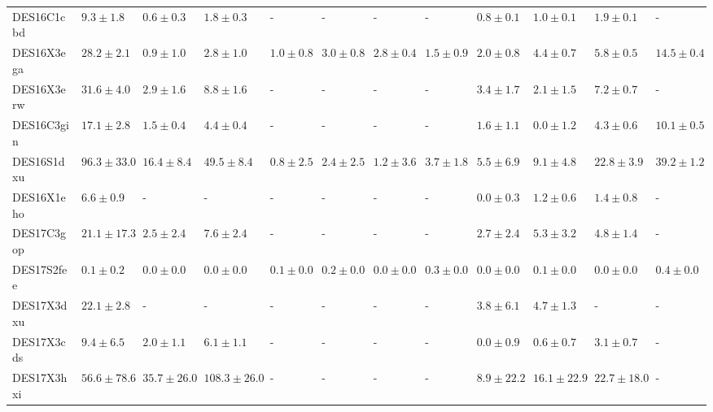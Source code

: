 \documentclass[fleqn,usenatbib,]{mnras}
\begin{document}
\begin{table}
\begin{tabular}{llllllllllll}
DES16C1cbd &    $9.3 \pm 1.8$ &    $0.6 \pm 0.3$ &     $1.8 \pm 0.3$ &               - &               - &               - &               - &   $0.8 \pm 0.1$ &    $1.0 \pm 0.1$ &    $1.9 \pm 0.1$ &                - \\
DES16X3ega &   $28.2 \pm 2.1$ &    $0.9 \pm 1.0$ &     $2.8 \pm 1.0$ &   $1.0 \pm 0.8$ &   $3.0 \pm 0.8$ &   $2.8 \pm 0.4$ &   $1.5 \pm 0.9$ &   $2.0 \pm 0.8$ &    $4.4 \pm 0.7$ &    $5.8 \pm 0.5$ &   $14.5 \pm 0.4$ \\
DES16X3erw &   $31.6 \pm 4.0$ &    $2.9 \pm 1.6$ &     $8.8 \pm 1.6$ &               - &               - &               - &               - &   $3.4 \pm 1.7$ &    $2.1 \pm 1.5$ &    $7.2 \pm 0.7$ &                - \\
DES16C3gin &   $17.1 \pm 2.8$ &    $1.5 \pm 0.4$ &     $4.4 \pm 0.4$ &               - &               - &               - &               - &   $1.6 \pm 1.1$ &    $0.0 \pm 1.2$ &    $4.3 \pm 0.6$ &   $10.1 \pm 0.5$ \\
DES16S1dxu &  $96.3 \pm 33.0$ &   $16.4 \pm 8.4$ &    $49.5 \pm 8.4$ &   $0.8 \pm 2.5$ &   $2.4 \pm 2.5$ &   $1.2 \pm 3.6$ &   $3.7 \pm 1.8$ &   $5.5 \pm 6.9$ &    $9.1 \pm 4.8$ &   $22.8 \pm 3.9$ &   $39.2 \pm 1.2$ \\
DES16X1eho &    $6.6 \pm 0.9$ &                - &                 - &               - &               - &               - &               - &   $0.0 \pm 0.3$ &    $1.2 \pm 0.6$ &    $1.4 \pm 0.8$ &                - \\
DES17C3gop &  $21.1 \pm 17.3$ &    $2.5 \pm 2.4$ &     $7.6 \pm 2.4$ &               - &               - &               - &               - &   $2.7 \pm 2.4$ &    $5.3 \pm 3.2$ &    $4.8 \pm 1.4$ &                - \\
DES17S2fee &    $0.1 \pm 0.2$ &    $0.0 \pm 0.0$ &     $0.0 \pm 0.0$ &   $0.1 \pm 0.0$ &   $0.2 \pm 0.0$ &   $0.0 \pm 0.0$ &   $0.3 \pm 0.0$ &   $0.0 \pm 0.0$ &    $0.1 \pm 0.0$ &    $0.0 \pm 0.0$ &    $0.4 \pm 0.0$ \\
DES17X3dxu &   $22.1 \pm 2.8$ &                - &                 - &               - &               - &               - &               - &   $3.8 \pm 6.1$ &    $4.7 \pm 1.3$ &                - &                - \\
DES17X3cds &    $9.4 \pm 6.5$ &    $2.0 \pm 1.1$ &     $6.1 \pm 1.1$ &               - &               - &               - &               - &   $0.0 \pm 0.9$ &    $0.6 \pm 0.7$ &    $3.1 \pm 0.7$ &                - \\
DES17X3hxi &  $56.6 \pm 78.6$ &  $35.7 \pm 26.0$ &  $108.3 \pm 26.0$ &               - &               - &               - &               - &  $8.9 \pm 22.2$ &  $16.1 \pm 22.9$ &  $22.7 \pm 18.0$ &                - \\

\end{tabular}
\end{table}
\end{document}
